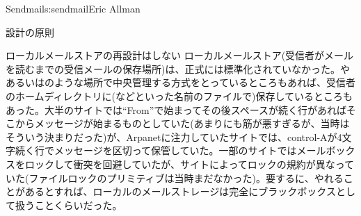 \begin{aosachapter}{Sendmail}{s:sendmail}{Eric Allman}
\begin{aosasect1}{設計の原則}
\begin{aosasect2}{ローカルメールストアの再設計はしない}
ローカルメールストア(受信者がメールを読むまでの受信メールの保存場所)は、正式には標準化されていなかった。やあるいはのような場所で中央管理する方式をとっているところもあれば、受信者のホームディレクトリに(などといった名前のファイルで)保存しているところもあった。大半のサイトでは``From''で始まってその後スペースが続く行があればそこからメッセージが始まるものとしていた(あまりにも筋が悪すぎるが、当時はそういう決まりだった)が、Arpanetに注力していたサイトでは、control-Aが4文字続く行でメッセージを区切って保管していた。一部のサイトではメールボックスをロックして衝突を回避していたが、サイトによってロックの規約が異なっていた(ファイルロックのプリミティブは当時まだなかった)。要するに、やれることがあるとすれば、ローカルのメールストレージは完全にブラックボックスとして扱うことくらいだった。


\end{aosasect2}
\end{aosasect1}
\end{aosachapter}
